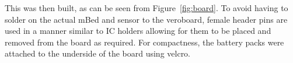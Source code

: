 This was then built, as can be seen from Figure~\ref{fig:board}. To avoid having to solder on the actual mBed and sensor to the veroboard, female header pins are used in a manner similar to IC holders allowing for them to be placed and removed from the board as required. For compactness, the battery packs were attached to the underside of the board using velcro. 


